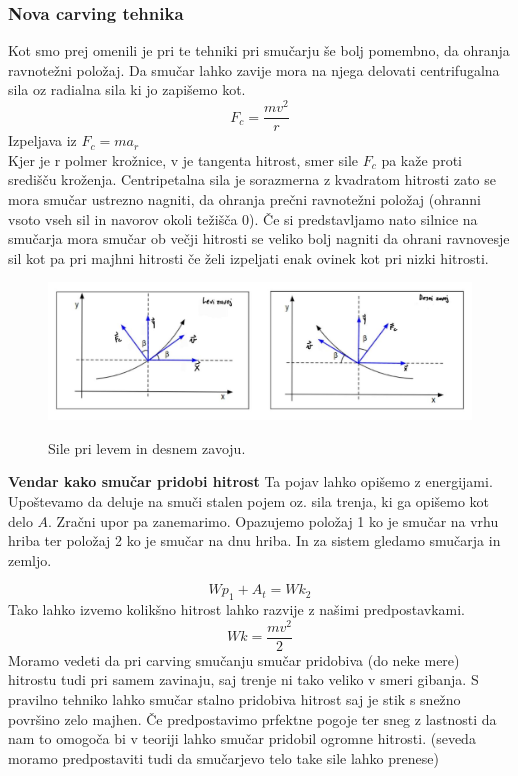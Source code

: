 \documentclass{article}
\begin{document}
\subsubsection*{Nova carving tehnika}
Kot smo prej omenili je pri te tehniki pri smučarju še bolj pomembno, da ohranja ravnotežni položaj. Da smučar lahko zavije mora na njega delovati
centrifugalna sila oz radialna sila ki jo zapišemo kot.
\[F_c=\frac{mv^2}{r}\]
Izpeljava iz $ F_c=ma_r $ \\ \newline
Kjer je r polmer krožnice, v je tangenta hitrost, smer sile $ F_c $ pa kaže proti središču kroženja. Centripetalna sila je sorazmerna z kvadratom hitrosti
zato se mora smučar ustrezno nagniti, da ohranja prečni ravnotežni položaj (ohranni vsoto vseh sil in navorov okoli težišča 0).
Če si predstavljamo nato silnice na smučarja mora smučar ob večji hitrosti se veliko bolj nagniti da ohrani ravnovesje sil kot pa pri majhni hitrosti 
če želi izpeljati enak ovinek kot pri nizki hitrosti.\\ \newline 

\begin{figure}
    \centering
    \includegraphics[scale=0.3]{../images/neke silo ovo ono.jpg} \\
    \caption[short]{Sile pri levem in desnem zavoju.}
\end{figure}

\textbf{Vendar kako smučar pridobi hitrost}
Ta pojav lahko opišemo z energijami. Upoštevamo da deluje na smuči stalen pojem oz. sila trenja, ki ga opišemo kot delo $ A $. Zračni upor pa zanemarimo.\newline
Opazujemo položaj 1 ko je smučar na vrhu hriba ter položaj 2 ko je smučar na dnu hriba. In za sistem gledamo smučarja in zemljo.

\[Wp_1+A_t=Wk_2\]
Tako lahko izvemo kolikšno hitrost lahko razvije z našimi predpostavkami. 
\[Wk=\frac{mv^2}{2}\]
Moramo vedeti da pri carving smučanju smučar pridobiva (do neke mere) hitrostu tudi pri samem zavinaju, saj trenje ni tako veliko v smeri gibanja.
S pravilno tehniko lahko smučar stalno pridobiva hitrost saj je stik s snežno površino zelo majhen. Če predpostavimo prfektne pogoje ter 
sneg z lastnosti da nam to omogoča bi v teoriji lahko smučar pridobil ogromne hitrosti. (seveda moramo predpostaviti tudi da smučarjevo telo take sile lahko prenese)
\end{document}
